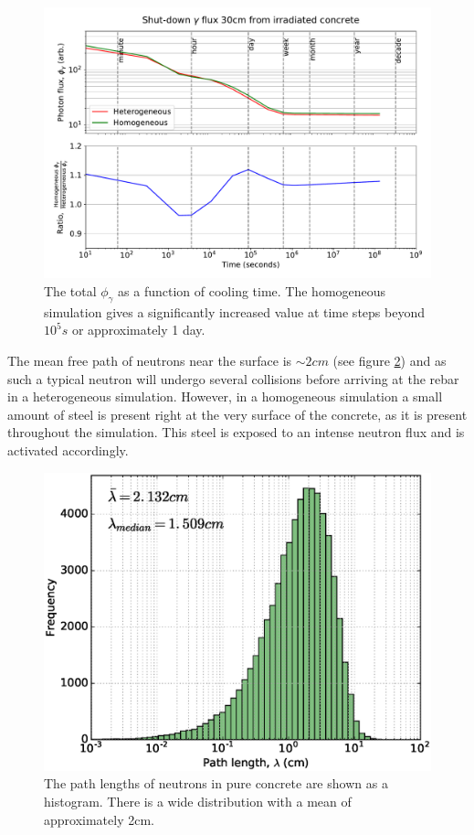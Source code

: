 \begin{figure}[H]
  \includegraphics[width=\textwidth]{sddr}
  \caption{The total $\phi_{\gamma}$ as a function of cooling time. The homogeneous simulation gives a significantly increased value at time steps beyond $10^{5}s$ or approximately 1 day.}
  \label{fig:sddr}
\end{figure}

The mean free path of neutrons near the surface is $\sim2cm$ (see figure \ref{fig:mfp}) and as such a typical neutron will undergo several collisions before arriving at the rebar in a heterogeneous simulation. However, in a homogeneous simulation a small amount of steel is present right at the very surface of the concrete, as it is present throughout the simulation. This steel is exposed to an intense neutron flux and is activated accordingly.

\begin{figure}[H]
  \includegraphics[width=\textwidth]{mfp}
  \caption{The path lengths of neutrons in pure concrete are shown as a histogram. There is a wide distribution with a mean of approximately 2cm.}
  \label{fig:mfp}
\end{figure}

